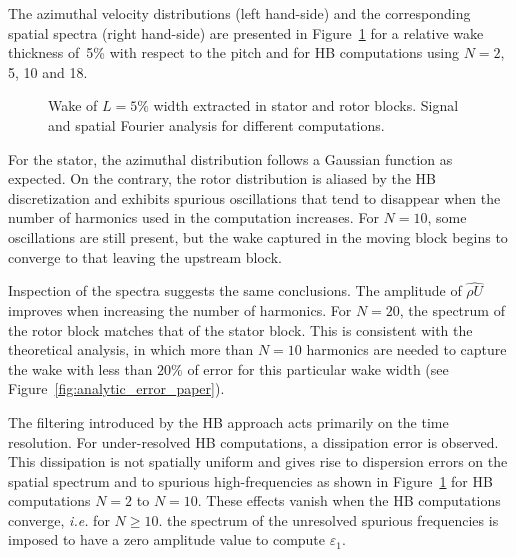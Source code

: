 The azimuthal velocity distributions (left hand-side) and the corresponding spatial
spectra (right hand-side)
are presented in Figure~\ref{fig:spatial_crit} 
for a relative wake thickness of~5\% with respect to the pitch 
and for HB computations using $N=2$, 5, 10 and 18.
\begin{figure}[htp]
  \centering
  \caption{Wake of $L=5\%$ width extracted in stator and rotor 
  blocks. Signal and spatial Fourier analysis for different computations.}
  \label{fig:spatial_crit}
\end{figure}
For the stator, the azimuthal distribution follows a 
Gaussian function as expected. On the contrary, 
the rotor distribution is aliased by the HB discretization 
and exhibits spurious oscillations that tend to disappear
when the number of harmonics used in the computation 
increases.
For $N=10$, some oscillations are still present, 
but the wake captured in the moving block begins to 
converge to that leaving the upstream block.

Inspection of the spectra suggests the same conclusions.
The amplitude of $\widehat{\rho U}$ 
improves when increasing the number of harmonics.
For $N=20$, the spectrum of the rotor 
block matches that of the stator block.
This is consistent with the theoretical analysis, in which more than 
$N=10$ harmonics are needed to capture the wake with less than $20\%$ 
of error for this particular
wake width (see Figure~\ref{fig:analytic_error_paper}).

The filtering introduced by the HB approach 
acts primarily on the time resolution. 
For under-resolved HB computations, a dissipation error is observed.
This dissipation is not spatially uniform and gives rise to
dispersion errors on the spatial spectrum and to spurious
high-frequencies as shown in 
Figure~\ref{fig:spatial_crit} for HB computations $N=2$ to $N=10$.
These effects vanish when the HB computations converge,
\emph{i.e.} for $N \geq 10$.
the spectrum of the unresolved spurious frequencies 
is imposed to have a zero amplitude value to compute
$\varepsilon_1$.

